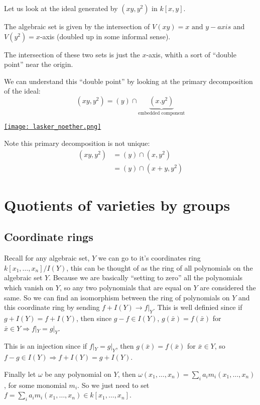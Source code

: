 \begin{example}
    Let us look at the ideal generated by $(xy,y^2)$ in $k[x,y]$.

    The algebraic set is given by the intersection of $V(xy) = x\text{ and }y-axis$ and $V(y^2) = x$-axis (doubled up in some informal sense).

    The intersection of these two sets is just the $x$-axis, whith a sort of ``double point'' near the origin.

    We can understand this ``double point'' by looking at the primary decomposition of the ideal:
    \[(xy,y^2) = (y)\cap \underbrace{(x.y^2)}_{\text{embedded component}}\]

    \href{https://youtu.be/1oKh8QJ1I4k?t=619}{\texttt{[image: lasker\_noether.png]}}

Note this primary decomposition is not unique:\begin{align*}
    (xy,y^2) &= (y)\cap (x,y^2)\\
             &= (y)\cap (x+y,y^2)
\end{align*}
\end{example}

\section{Quotients of varieties by groups}

\subsection{Coordinate rings}
Recall for any algebraic set, $Y$ we can go to it's coordinates ring $k[x_1,\dots,x_n]/I(Y)$, this can be thought of as the ring of all polynomials on the algebraic set $Y$.
Because we are basically ``setting to zero'' all the polynomials which vanish on $Y$, so any two polynomials that are equal on $Y$ are considered the same. So we can find an isomorphism between the ring of polynomials on $Y$ and this coordinate ring by sending $f+I(Y)\rightarrow f|_Y$. This is well definied since if $g+I(Y) = f+I(Y)$, then since $g-f\in I(Y)$, $g(\bar{x}) = f(\bar{x})$ for $\bar{x}\in Y \Rightarrow f|_Y = g|_Y$.

This is an injection since if $f|_Y = g|_Y$, then $g(\bar{x}) = f(\bar{x})$ for $\bar{x}\in Y$, so $f-g\in I(Y)\Rightarrow f+I(Y) = g+I(Y)$.

Finally let $\omega$ be any polynomial on $Y$, then $\omega(x_1,\dots,x_n) = \sum_{i} {a_i}{m_i(x_1,\dots,x_n)}$, for some monomial $m_i$. So we just need to set $f = \sum_{i} {a_i}{m_i(x_1,\dots,x_n)}\in k[x_1,\dots,x_n]$.

